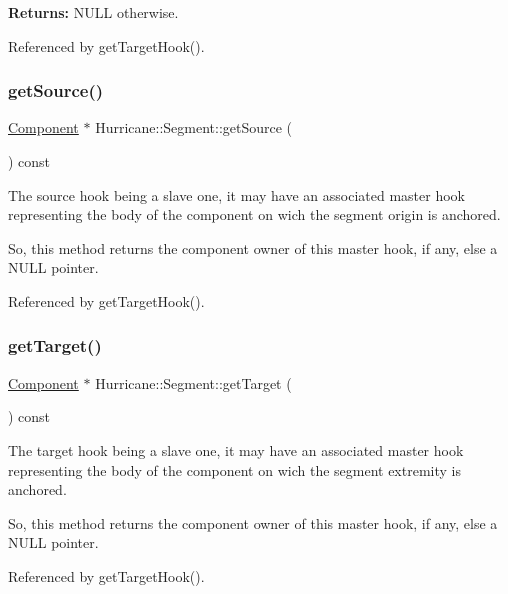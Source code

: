 {\bfseries Returns\+:} N\+U\+LL otherwise. 

Referenced by get\+Target\+Hook().

\mbox{\label{classHurricane_1_1Segment_aaa8954fc5948f2a881cdbc9213f9f7a9}} 
\subsubsection{\texorpdfstring{get\+Source()}{getSource()}}
{\footnotesize\ttfamily \hyperlink{classHurricane_1_1Component}{Component} $\ast$ Hurricane\+::\+Segment\+::get\+Source (\begin{DoxyParamCaption}{ }\end{DoxyParamCaption}) const}

The source hook being a slave one, it may have an associated master hook representing the body of the component on wich the segment origin is anchored.

So, this method returns the component owner of this master hook, if any, else a N\+U\+LL pointer. 

Referenced by get\+Target\+Hook().

\mbox{\label{classHurricane_1_1Segment_a1f7f13b33be3b1a20ea23b3f501296e9}} 
\subsubsection{\texorpdfstring{get\+Target()}{getTarget()}}
{\footnotesize\ttfamily \hyperlink{classHurricane_1_1Component}{Component} $\ast$ Hurricane\+::\+Segment\+::get\+Target (\begin{DoxyParamCaption}{ }\end{DoxyParamCaption}) const}

The target hook being a slave one, it may have an associated master hook representing the body of the component on wich the segment extremity is anchored.

So, this method returns the component owner of this master hook, if any, else a N\+U\+LL pointer. 

Referenced by get\+Target\+Hook().

